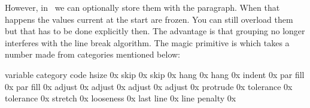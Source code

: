However, in \LUAMETATEX\ we can optionally store them with the paragraph. When
that happens the values current at the start are frozen. You can still overload
them but that has to be done explicitly then. The advantage is that grouping no
longer interferes with the line break algorithm. The magic primitive is \type
{\snapshotpar} which takes a number made from categories mentioned below:

\starttabulate[|l|l|r|]
\BC variable                       \BC category        \BC code                                     \NC \NR
\NC \type {\hsize}                 \NC hsize           \NC 0x\uchexnumbers\frozenhsizecode          \NC \NR
\NC \type {\leftskip}              \NC skip            \NC 0x\uchexnumbers\frozenskipcode           \NC \NR
\NC \type {\rightskip}             \NC skip            \NC 0x\uchexnumbers\frozenskipcode           \NC \NR
\NC \type {\hangindent}            \NC hang            \NC 0x\uchexnumbers\frozenhangcode           \NC \NR
\NC \type {\hangafter}             \NC hang            \NC 0x\uchexnumbers\frozenhangcode           \NC \NR
\NC \type {\parindent}             \NC indent          \NC 0x\uchexnumbers\frozenindentcode         \NC \NR
\NC \type {\parfillleftskip}       \NC par fill        \NC 0x\uchexnumbers\frozenparfillcode        \NC \NR
\NC \type {\parfillrightskip}      \NC par fill        \NC 0x\uchexnumbers\frozenparfillcode        \NC \NR
\NC \type {\adjustspacing}         \NC adjust          \NC 0x\uchexnumbers\frozenadjustcode         \NC \NR
\NC \type {\adjustspacingstep}     \NC adjust          \NC 0x\uchexnumbers\frozenadjustcode         \NC \NR
\NC \type {\adjustspacingshrink}   \NC adjust          \NC 0x\uchexnumbers\frozenadjustcode         \NC \NR
\NC \type {\adjustspacingstretch}  \NC adjust          \NC 0x\uchexnumbers\frozenadjustcode         \NC \NR
\NC \type {\protrudechars}         \NC protrude        \NC 0x\uchexnumbers\frozenprotrudecode       \NC \NR
\NC \type {\pretolerance}          \NC tolerance       \NC 0x\uchexnumbers\frozentolerancecode      \NC \NR
\NC \type {\tolerance}             \NC tolerance       \NC 0x\uchexnumbers\frozentolerancecode      \NC \NR
\NC \type {\emergencystretch}      \NC stretch         \NC 0x\uchexnumbers\frozenstretchcode        \NC \NR
\NC \type {\looseness}             \NC looseness       \NC 0x\uchexnumbers\frozenloosenesscode      \NC \NR
\NC \type {\lastlinefit}           \NC last line       \NC 0x\uchexnumbers\frozenlastlinecode       \NC \NR
\NC \type {\linepenalty}           \NC line penalty    \NC 0x\uchexnumbers\frozenlinepenaltycode    \NC \NR
